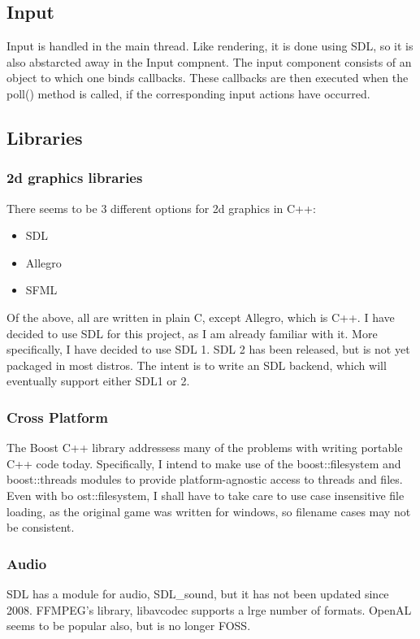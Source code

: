 \documentclass[a4paper]{article}
\begin{document}
    \subsection{Input}
    Input is handled in the main thread. Like rendering, it is done using SDL, so it is also abstarcted away in the Input compnent.
    The input component consists of an object to which one binds callbacks. These callbacks are then executed when the poll() method is called, if the corresponding input actions have occurred.

    
    \subsection{Libraries}
        \subsubsection{2d graphics libraries}
    	There seems to be 3 different options for 2d graphics in C++:
    	\begin{itemize}
    	    \item{SDL}
    	    \item{Allegro}
    	    \item{SFML}
    	\end{itemize}
    	
    	Of the above, all are written in plain C, except Allegro, which is C++.
    	I have decided to use SDL for this project, as I am already familiar with it.
    	More specifically, I have decided to use SDL 1.
    	SDL 2 has been released, but is not yet packaged in most distros. 
    	The intent is to write an SDL backend, which will eventually support either SDL1 or 2.
    	
    	\subsubsection{Cross Platform}
        The Boost C++ library addressess many of the problems with writing portable C++ code today.
        Specifically, I intend to make use of the boost::filesystem and boost::threads modules to provide platform-agnostic access to threads and files.
        Even with bo	ost::filesystem, I shall have to take care to use case insensitive file loading, as the original game was written for windows, so filename cases may not be consistent.
        
        \subsubsection{Audio}
        SDL has a module for audio, SDL\_sound\cite{sdls}, but it has not been updated since 2008.
        FFMPEG's library, libavcodec\cite{libavcodec} supports a lrge number of formats.
        OpenAL seems to be popular also, but is no longer FOSS.
\newpage
\end{document}
